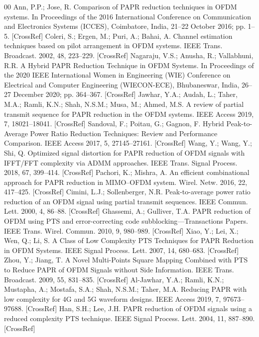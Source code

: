 \documentclass[conference]{IEEEtran}
\begin{document}
\begin{thebibliography}{00}
 Ann, P.P.; Jose, R. Comparison of PAPR reduction techniques in OFDM systems. In Proceedings of the 2016 International Conference on Communication and Electronics Systems (ICCES), Coimbatore, India, 21–22 October 2016; pp. 1–5. [CrossRef]
 Coleri, S.; Ergen, M.; Puri, A.; Bahai, A. Channel estimation techniques based on pilot arrangement in OFDM systems. IEEE Trans. Broadcast. 2002, 48, 223–229. [CrossRef]
 Nagaraju, V.S.; Anusha, R.; Vallabhuni, R.R. A Hybrid PAPR Reduction Technique in OFDM Systems. In Proceedings of the 2020 IEEE International Women in Engineering (WIE) Conference on Electrical and Computer Engineering (WIECON-ECE), Bhubaneswar, India, 26–27 December 2020; pp. 364–367. [CrossRef]
 Jawhar, Y.A.; Audah, L.; Taher, M.A.; Ramli, K.N.; Shah, N.S.M.; Musa, M.; Ahmed, M.S. A review of partial transmit sequence for PAPR reduction in the OFDM systems. IEEE Access 2019, 7, 18021–18041. [CrossRef]
 Sandoval, F.; Poitau, G.; Gagnon, F. Hybrid Peak-to-Average Power Ratio Reduction Techniques: Review and Performance Comparison. IEEE Access 2017, 5, 27145–27161. [CrossRef]
 Wang, Y.; Wang, Y.; Shi, Q. Optimized signal distortion for PAPR reduction of OFDM signals with IFFT/FFT complexity via ADMM approaches. IEEE Trans. Signal Process. 2018, 67, 399–414. [CrossRef]
 Pachori, K.; Mishra, A. An efficient combinational approach for PAPR reduction in MIMO–OFDM system. Wirel. Netw. 2016, 22, 417–425. [CrossRef]
 Cimini, L.J.; Sollenberger, N.R. Peak-to-average power ratio reduction of an OFDM signal using partial transmit sequences. IEEE Commun. Lett. 2000, 4, 86–88. [CrossRef]
 Ghassemi, A.; Gulliver, T.A. PAPR reduction of OFDM using PTS and error-correcting code subblocking—Transactions Papers. IEEE Trans. Wirel. Commun. 2010, 9, 980–989. [CrossRef]
 Xiao, Y.; Lei, X.; Wen, Q.; Li, S. A Class of Low Complexity PTS Techniques for PAPR Reduction in OFDM Systems. IEEE Signal Process. Lett. 2007, 14, 680–683. [CrossRef]
 Zhou, Y.; Jiang, T. A Novel Multi-Points Square Mapping Combined with PTS to Reduce PAPR of OFDM Signals without Side Information. IEEE Trans. Broadcast. 2009, 55, 831–835. [CrossRef]
 Al-Jawhar, Y.A.; Ramli, K.N.; Mustapha, A.; Mostafa, S.A.; Shah, N.S.M.; Taher, M.A. Reducing PAPR with low complexity for 4G and 5G waveform designs. IEEE Access 2019, 7, 97673–97688. [CrossRef]
 Han, S.H.; Lee, J.H. PAPR reduction of OFDM signals using a reduced complexity PTS technique. IEEE Signal Process. Lett. 2004, 11, 887–890. [CrossRef]

\end{thebibliography}
\end{document}
